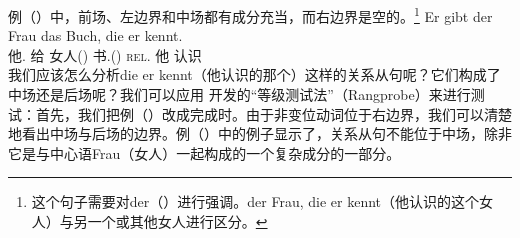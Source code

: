 例（）中，前场、左边界和中场都有成分充当，而右边界是空的。\footnote{%
这个句子需要对der（）进行强调。der Frau, die er kennt（他认识的这个女人）与另一个或其他女人进行区分。}
\ea
\gll Er        gibt  der         Frau      das           Buch,    die er kennt.\\
     他.\mas{} 给     女人(\fem)  书.(\neu) \textsc{rel}.\fem{} 他 认识\\
\z 
我们应该怎么分析die er
kennt（他认识的那个）这样的关系从句呢？它们构成了中场还是后场呢？我们可以应用 \citet[]{Bech55a}开发的“等级测试法”（Rangprobe）来进行测试：首先，我们把例（）改成完成时。由于非变位动词位于右边界，我们可以清楚地看出中场与后场的边界。例（）中的例子显示了，关系从句不能位于中场，除非它是与中心语Frau（女人）一起构成的一个复杂成分的一部分。
\eal
{}
\zl

